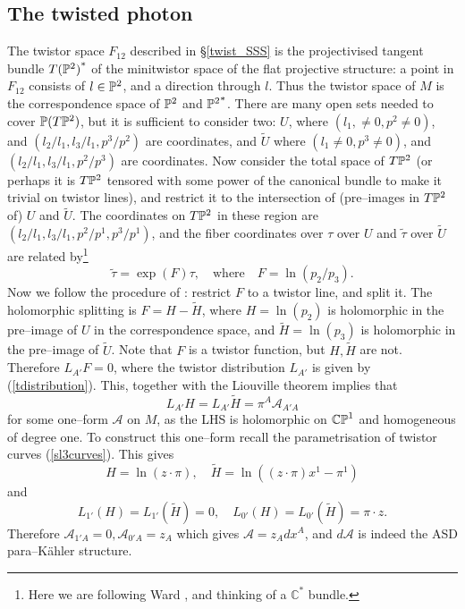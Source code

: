 \subsection{The twisted photon}
The twistor space $F_{12}$ described in \S\ref{twist_SSS} is the projectivised tangent bundle ${T(\mathbb{P}^2)}^*$ of the minitwistor space of the flat projective structure: a point in $F_{12}$ consists of $l\in\mathbb{P}^2$, and a direction through $l$. Thus the twistor space of $M$ is the correspondence space
of $\mathbb{P}^2$ and ${\mathbb{P}^2}^*$. 
There are many open sets needed to cover
$\mathbb{P}(T\mathbb{P}^2)$, but it is sufficient to consider two:
$U$, where $(l_1, \neq 0, p^2\neq 0)$, and $(l_2/l_1, l_3/l_1, p^3/p^2)$ are coordinates, and $\widetilde{U}$ where
$(l_1\neq 0, p^3\neq 0)$, and  $(l_2/l_1, l_3/l_1, p^2/p^3)$
are coordinates. Now consider the total
space of $T\mathbb{P}^2$ (or perhaps it is $T\mathbb{P}^2$ tensored
with some power of the canonical bundle to make it trivial on twistor
lines), and restrict it to the intersection of (pre--images in
$T\mathbb{P}^2$
of) $U$ and $\widetilde{U}$. The coordinates on $T\mathbb{P}^2$ in these
region are $(l_2/l_1, l_3/l_1, p^2/p^1, p^3/p^1)$, and the fiber
coordinates over $\tau$ over $U$ and $\tilde{\tau}$ over 
$\widetilde{U}$ are related by\footnote{Here we are following Ward \cite{wardtf},
and thinking of a $\mathbb{C}^*$ bundle.}
\[
\tilde \tau=\exp(F)\tau, \quad\mbox{where}\quad  
F=\ln{(p_2/p_3)}.
\]
Now we follow the procedure of \cite{wardtf}: restrict $F$ to a twistor line,
and split it.
The holomorphic splitting is $F=H-\widetilde{H}$, where
$H=\ln{(p_2)}$ is holomorphic in the pre--image of $U$ in the correspondence space, and 
$\widetilde{H}=\ln{(p_3)}$ is holomorphic in the pre--image of
$\widetilde{U}$. Note that $F$ is a twistor  function, but 
$H, \widetilde{H}$ are not. Therefore
$L_{A'}F=0$, where the twistor distribution $L_{A'}$
is given by (\ref{tdistribution}). This, 
together with the Liouville theorem
implies
that
\[
L_{A'}H=L_{A'}\widetilde{H}=\pi^A\mathcal{A}_{A'A}
\]
for some one--form $\mathcal{A}$ on $M$, 
as the LHS is holomorphic on  $\mathbb{CP}^1$ and homogeneous of degree
one. To construct this one--form recall the parametrisation
of twistor curves (\ref{sl3curves}). This gives
\[
H=\ln{(z\cdot\pi)}, \quad\widetilde{H}=\ln{((z\cdot\pi)x^1-\pi^1)}
\]
and
\[
L_{1'}(H)=L_{1'}(\widetilde{H})=0, \quad
L_{0'}(H)=L_{0'}(\widetilde{H})=\pi\cdot z.
\]
Therefore ${\mathcal A}_{1'A}=0, {\mathcal A}_{0'A}=z_A$
which gives ${\mathcal A}=z_Adx^A$, and $d{\mathcal A}$
is indeed the ASD para--K\"ahler structure.
